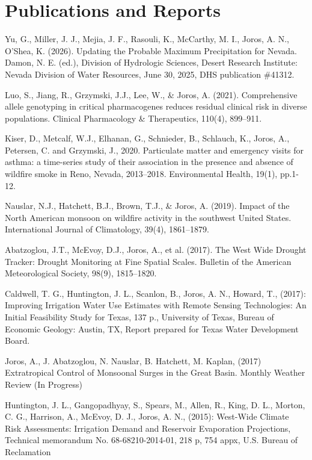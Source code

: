 \documentclass[letterpaper,11pt]{article}
\begin{document}
\section{Publications and Reports}
 \begin{enumerate}[leftmargin=0.25in, label=\arabic*.]
    \small{\item Yu, G., Miller, J. J., Mejia, J. F., Rasouli, K., McCarthy, M. I., Joros, A. N., O'Shea, K. (2026). Updating the Probable Maximum Precipitation for Nevada. Damon, N. E. (ed.), Division of Hydrologic Sciences, Desert Research Institute: Nevada Division of Water Resources, June 30, 2025, DHS publication \#41312.}
    \item Luo, S., Jiang, R., Grzymski, J.J., Lee, W., \& Joros, A. (2021). Comprehensive allele genotyping in critical pharmacogenes reduces residual clinical risk in diverse populations. Clinical Pharmacology \& Therapeutics, 110(4), 899–911.
    \item Kiser, D., Metcalf, W.J., Elhanan, G., Schnieder, B., Schlauch, K., Joros, A., Petersen, C. and Grzymski, J., 2020. Particulate matter and emergency visits for asthma: a time-series study of their association in the presence and absence of wildfire smoke in Reno, Nevada, 2013–2018. Environmental Health, 19(1), pp.1-12.
    \item Nauslar, N.J., Hatchett, B.J., Brown, T.J., \& Joros, A. (2019). Impact of the North American monsoon on wildfire activity in the southwest United States. International Journal of Climatology, 39(4), 1861–1879.
    \item Abatzoglou, J.T., McEvoy, D.J., Joros, A., et al. (2017). The West Wide Drought Tracker: Drought Monitoring at Fine Spatial Scales. Bulletin of the American Meteorological Society, 98(9), 1815–1820.
    \item Caldwell, T. G., Huntington, J. L., Scanlon, B., Joros, A. N., Howard, T., (2017): Improving Irrigation Water Use Estimates with Remote Sensing Technologies: An Initial Feasibility Study for Texas, 137 p., University of Texas, Bureau of Economic Geology: Austin, TX, Report prepared for Texas Water Development Board.
    \item Joros, A., J. Abatzoglou, N. Nauslar, B. Hatchett, M. Kaplan, (2017) Extratropical Control of Monsoonal Surges in the Great Basin. Monthly Weather Review (In Progress)
    \item Huntington, J. L., Gangopadhyay, S., Spears, M., Allen, R., King, D. L., Morton, C. G., Harrison, A., McEvoy, D. J., Joros, A. N., (2015): West-Wide Climate Risk Assessments: Irrigation Demand and Reservoir Evaporation Projections, Technical memorandum No. 68-68210-2014-01, 218 p, 754 appx, U.S. Bureau of Reclamation

\end{enumerate}
\end{document}
